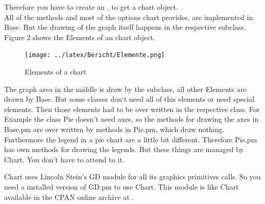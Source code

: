 Therefore you have to create an , to get a chart object.\\
All of the methods and most of the options chart provides, are implemented in Base. But the drawing of the graph itself happens in the respective subclass. Figure 2 shows the Elements of an chart object.\\  
\begin{figure}[h]
	\begin{center}
		\texttt{[image: ../latex/Bericht/Elemente.png]}
	\end{center}
	\caption{Elements of a chart}
	\label{fig:Elemente}
\end{figure}
The graph area in the middle is draw by the subclass, all other Elements are drawn by Base. But some classes don`t need all of this elements or need special elements. Then those elements had to be over written in the respective class. For Example the class Pie doesn't need axes, so the methods for drawing the axes in Base.pm are over written by methods in Pie.pm, which draw nothing. Furthermore the legend in a pie chart are a little bit different. Therefore Pie.pm has own methods for drawing the legends. But these things are managed by Chart. You don't have to attend to it. \par
Chart uses Lincoln Stein's GD module for all its graphics primitives calls. So you need a installed version of GD.pm to use Chart. This module is like Chart available in the CPAN online archive at . \\       